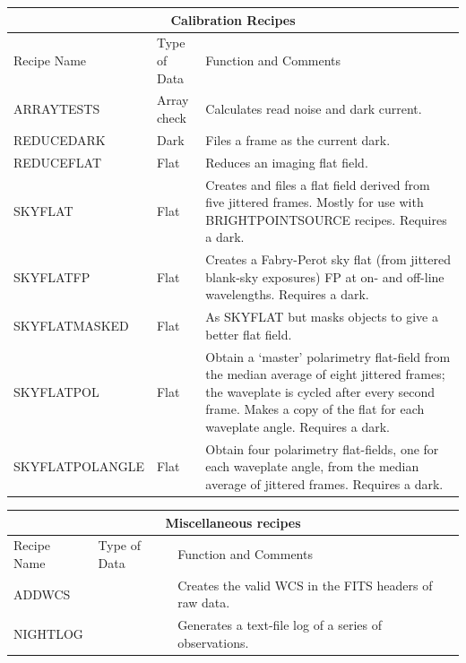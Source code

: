 \documentclass[twoside,11pt]{article}
\newcommand{\htmlref}[2]{#1}
\renewcommand{\_}{\texttt{\symbol{95}}}
\begin{document}
\begin{center}
\begin{tabular}{|l|l|p{77mm}|}
\multicolumn{3}{c}{\large{\bf Calibration Recipes}} \vspace*{1ex} \\
\hline
Recipe Name & Type of Data & Function and Comments \\ \hline
\htmlref{ARRAY\_TESTS}{ARRAY\_TESTS} & Array check &
   Calculates read noise and dark current. \\ \hline
\htmlref{REDUCE\_DARK}{REDUCE\_DARK} & Dark &
   Files a frame as the current dark. \\ \hline
\htmlref{REDUCE\_FLAT}{REDUCE\_FLAT} & Flat &
   Reduces an imaging flat field.\\ \hline
\htmlref{SKY\_FLAT}{SKY\_FLAT} & Flat &
   Creates and files a flat field derived from five jittered frames.
   Mostly for use with BRIGHT\_POINT\_SOURCE recipes. Requires a
   dark.\\ \hline
\htmlref{SKY\_FLAT\_FP}{SKY\_FLAT\_FP} & Flat &
   Creates a Fabry-Perot sky flat (from jittered blank-sky exposures) 
   FP at on- and off-line wavelengths.  Requires a dark. \\ \hline
\htmlref{SKY\_FLAT\_MASKED}{SKY\_FLAT\_MASKED} & Flat &
   As SKY\_FLAT but masks objects to give a better flat field. \\ \hline
\htmlref{SKY\_FLAT\_POL}{SKY\_FLAT\_POL} & Flat &
   Obtain a `master' polarimetry flat-field from the median average
   of eight jittered frames; the waveplate is cycled after
   every second frame.  Makes a copy of the flat for each
   waveplate angle. Requires a dark.\\ \hline
\htmlref{SKY\_FLAT\_POL\_ANGLE}{SKY\_FLAT\_POL\_ANGLE} & Flat &
   Obtain four polarimetry flat-fields, one for each waveplate angle,
   from the median average of jittered frames. Requires a dark.\\ \hline
\end{tabular}
\end{center}
\bigskip

\begin{center}
\begin{tabular}{|p{37mm}|l|p{86mm}|}
\multicolumn{3}{c}{\large{\bf Miscellaneous recipes}} \vspace*{1ex} \\
\hline
Recipe Name & Type of Data & Function and Comments \\ \hline
\htmlref{ADDWCS}{ADDWCS} & &
   Creates the valid WCS in the FITS headers of raw data.\\ \hline
\htmlref{NIGHT\_LOG}{NIGHT\_LOG} & &
   Generates a text-file log of a series of observations.\\ \hline
\end{tabular}
\end{center}
\end{document}
